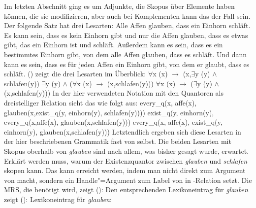 Im letzten Abschnitt ging es um Adjunkte, die Skopus über Elemente haben können, die sie
modifizieren, aber auch bei Komplementen kann das der Fall sein. Der folgende Satz hat drei Lesarten:
\ea
Alle Affen glauben, dass ein Einhorn schläft.
\z
\largerpage[-1]
Es kann sein, dass es kein Einhorn gibt und nur die Affen glauben, dass es etwas gibt, das ein
Einhorn ist und schläft. Außerdem kann es sein, dass es ein bestimmtes Einhorn gibt, von dem alle
Affen glauben, dass es schläft. Und dann kann es sein, dass es für jeden Affen ein Einhorn gibt, von
dem er glaubt, dass es schläft. () zeigt die drei Lesarten im Überblick:
\eal
\label{ex-Prädikatenlogik-alle-Affen-glauben-dass-ein-Einhorn-schläft}
\ex $\forall$x (x) $\to$ (x,$\exists$y (y) $\wedge$ schlafen(y))
\ex $\exists$y (y) $\wedge$ ($\forall$x (x) $\to$ (x,schlafen(y)))
\ex $\forall$x (x) $\to$ ($\exists$y (y) $\wedge$ (x,schlafen(y)))
\zl
In der hier verwendeten Notation mit den Quantoren als dreistelliger Relation sieht das wie folgt aus:
\eal
\label{ex-Quantoren-Relationen-alle-Affen-glauben-dass-ein-Einhorn-schläft}
\ex every\_q(x, affe(x), glauben(x,exist\_q(y, einhorn(y), schlafen(y))))
\ex exist\_q(y, einhorn(y), every\_q(x,affe(x), glauben(x,schlafen(y)))
\ex every\_q(x, affe(x), exist\_q(y, einhorn(y), glauben(x,schlafen(y)))
\zl
Letztendlich ergeben sich diese Lesarten in der hier beschriebenen Grammatik fast von selbst. Die
beiden Lesarten mit Skopus oberhalb von \emph{glauben} sind nach allem, was bisher gesagt wurde,
erwartet. Erklärt werden muss, warum der Existenzquantor zwischen \emph{glauben} und \emph{schlafen}
skopen kann. Das kann erreicht werden, indem man nicht  direkt zum Argument von
 macht, sondern ein Handle"=Argument zum Label von  in
\qeq-Relation setzt. Die MRS, die benötigt wird, zeigt ():
\ea
{}
\z
Den entsprechenden Lexikoneintrag für \emph{glauben} zeigt ():
\eas
\label{le-glauben}%
Lexikoneintrag für \emph{glauben}:\\
